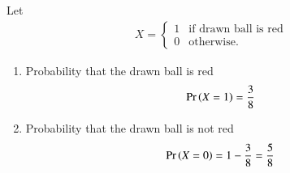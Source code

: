 Let 
\begin{align}
X= \begin{cases} 
      1 & \text{if drawn ball is red} \\
      0 & \text{otherwise.} 
   \end{cases}
\end{align}
\begin{enumerate}[label=(\roman*)]
    \item Probability that the drawn ball is red
    \begin{align}
    \Pr\left(X=1\right)
    = \frac{3}{8}\\
    \end{align}
    \item Probability that the drawn ball is not red
    \begin{align}
     \Pr\left(X=0\right)= 1-\frac{3}{8} = \frac{5}{8}
    \end{align}
\end{enumerate}



